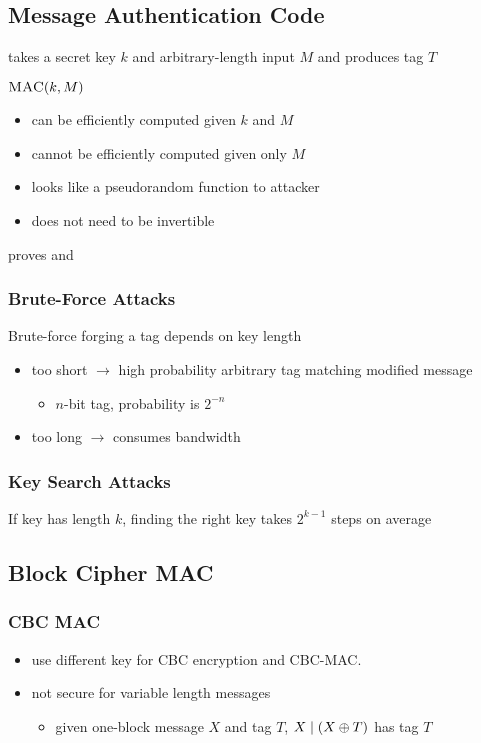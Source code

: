 \documentclass[draft]{article}
\begin{document}
\subsection{Message Authentication Code}
takes a secret key $k$ and arbitrary-length input $M$ and produces tag $T$

$\textproc{MAC}(k, M)$
\begin{itemize}[nosep]
    \item can be efficiently computed given $k$ and $M$
    \item cannot be efficiently computed given only $M$
    \item looks like a pseudorandom function to attacker
    \item does not need to be invertible
\end{itemize}
proves  and 
\subsubsection{Brute-Force Attacks}
Brute-force forging a tag depends on key length
\begin{itemize}[nosep]
    \item too short $\rightarrow$ high probability arbitrary tag matching modified message
          \begin{itemize}[nosep]\item $n$-bit tag, probability is $2^{-n}$\end{itemize}
    \item too long $\rightarrow$ consumes bandwidth
\end{itemize}
\subsubsection{Key Search Attacks}
If key has length $k$, finding the right key takes $2^{k-1}$ steps on average
\subsection{Block Cipher MAC}
\subsubsection*{CBC MAC}
\begin{itemize}[nosep]
    \item use different key for CBC encryption and CBC-MAC.
    \item not secure for variable length messages
          \begin{itemize}[nosep]\item given one-block message $X$ and tag $T$, $X \mid (X \oplus T)$ has tag $T$\end{itemize}
\end{itemize}
\end{document}
